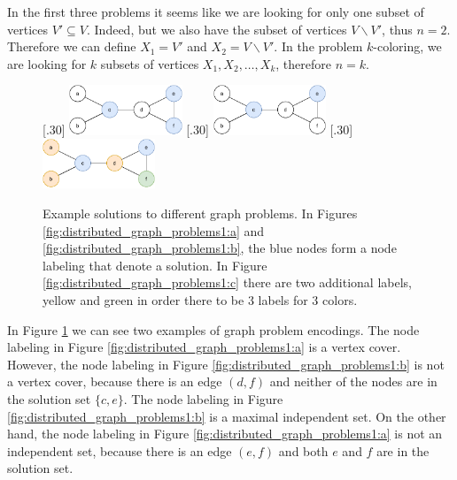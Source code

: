 In the first three problems it seems like we are looking for only one subset of vertices $V' \subseteq V$.
Indeed, but we also have the subset of vertices $V \backslash V'$, thus $n=2$.
Therefore we can define $X_1 = V'$ and $X_2 = V \backslash V'$.
In the problem $k$-coloring, we are looking for $k$ subsets of vertices $X_1, X_2, \dotsc, X_k$, therefore $n=k$.

\begin{figure}[H]
    [.30\linewidth] {
    \centering
    \includegraphics[width=0.30\textwidth]{diagrams/formalizing_pn_network_6.pdf}
  }
  \hfill
    [.30\linewidth] {
    \centering
    \includegraphics[width=0.30\textwidth]{diagrams/formalizing_pn_network_7.pdf}
  }
  \hfill
    [.30\linewidth] {
    \centering
    \includegraphics[width=0.30\textwidth]{diagrams/formalizing_pn_network_8.pdf}
  }
  \caption{Example solutions to different graph problems.
  In Figures \ref{fig:distributed_graph_problems1:a} and \ref{fig:distributed_graph_problems1:b}, the blue nodes form a node labeling that denote a solution.
  In Figure \ref{fig:distributed_graph_problems1:c} there are two additional labels, yellow and green in order there to be 3 labels for 3 colors.
  }
  \label{fig:distributed_graph_problems1}
\end{figure}

In Figure \ref{fig:distributed_graph_problems1} we can see two examples of graph problem encodings.
The node labeling in Figure \ref{fig:distributed_graph_problems1:a} is a vertex cover.
However, the node labeling in Figure \ref{fig:distributed_graph_problems1:b} is not a vertex cover, because there is an edge $(d, f)$ and neither of the nodes are in the solution set $\{c, e\}$.
The node labeling in Figure \ref{fig:distributed_graph_problems1:b} is a maximal independent set.
On the other hand, the node labeling in Figure \ref{fig:distributed_graph_problems1:a} is not an independent set, because there is an edge $(e, f)$ and both $e$ and $f$ are in the solution set.



